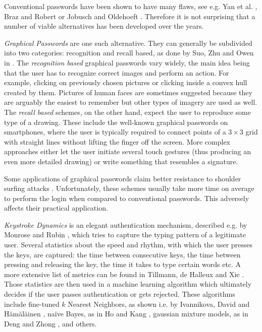 Conventional passwords have been shown to have many flaws, see e.g. Yan et al. \cite{yan:2004:password}, Braz and Robert \cite{braz:2006:security} or Jobusch and Oldehoeft \cite{jobusch:1989:survey-of-password-mechanisms-1, jobusch:1989:survey-of-password-mechanisms-2}. Therefore it is not surprising that a number of viable alternatives has been developed over the years.

\emph{Graphical Passwords} are one such alternative. They can generally be subdivided into two categories: recognition and recall based, as done by Suo, Zhu and Owen in \cite{suo:2005:graphical-passwords-survey}. The \emph{recognition based} graphical passwords vary widely, the main idea being that the user has to recognize correct images and perform an action. For example, clicking on previously chosen pictures or clicking inside a convex hull created by them. Pictures of human faces are sometimes suggested because they are arguably the easiest to remember but other types of imagery are used as well. The \emph{recall based} schemes, on the other hand, expect the user to reproduce some type of a drawing. These include the well-known graphical passwords on smartphones, where the user is typically required to connect points of a \(3 \times 3\) grid with straight lines without lifting the finger off the screen. More complex approaches either let the user initiate several touch gestures (thus producing an even more detailed drawing) or write something that resembles a signature.

Some applications of graphical passwords claim better resistance to shoulder surfing attacks \cite{suo:2005:graphical-passwords-survey}. Unfortunately, these schemes usually take more time on average to perform the login when compared to conventional passwords. This adversely affects their practical application.

\emph{Keystroke Dynamics} is an elegant authentication mechanism, described e.g. by Monrose and Rubin \cite{monrose:2000:keystroke-dynamics}, which tries to capture the typing pattern of a legitimate user. Several statistics about the speed and rhythm, with which the user presses the keys, are captured: the time between consecutive keys, the time between pressing and releasing the key, the time it takes to type certain words etc. A more extensive list of metrics can be found in  Tillmann, de Halleux and Xie \cite{teh:2013:survey-keystroke-biometrics}. Those statistics are then used in a machine learning algorithm which ultimately decides if the user passes authentication or gets rejected. These algorithms include fine-tuned \(k\) Nearest Neighbors, as shown i.e. by Ivannikova, David and Hämäläinen \cite{ivannikova:2017:anomaly-detection-keystroke-dynamics}, naïve Bayes, as in Ho and Kang \cite{ho:2017:onenb}, gaussian mixture models, as in Deng and Zhong \cite{yunbin:2013:gmm-keystroke}, and others.


